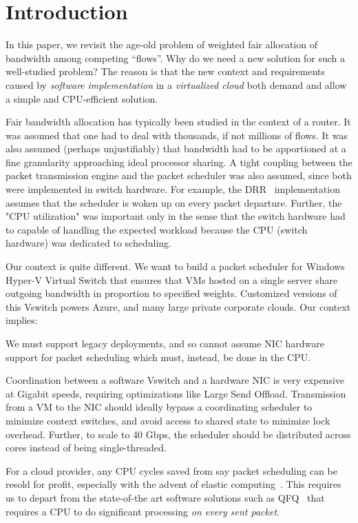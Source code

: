 \section {Introduction}

In this paper, we revisit the age-old problem of weighted fair allocation of
bandwidth among competing ``flows''. Why do we need a new solution for such a
well-studied problem? The reason is that the new context and requirements caused
by {\em software implementation} in a {\em virtualized cloud} both demand and
allow a simple and CPU-efficient solution. 

Fair bandwidth allocation has typically been studied in the context of a router.
It was assumed that one had to deal with thousands, if not millions of flows. It
was also assumed (perhaps unjustifiably) that bandwidth had to be apportioned at
a fine granularity approaching ideal processor sharing. A tight coupling between
the packet transmission engine and the packet scheduler was also assumed, since
both were implemented in switch hardware.  For example, the DRR~\cite{drr}
implementation assumes that the scheduler is woken up on every packet departure.
Further, the "CPU utilization" was important only in the sense that the switch
hardware had to capable of handling the expected workload because the CPU
(switch hardware) was dedicated to scheduling.

Our context is quite different. We want to build a packet scheduler for Windows
Hyper-V Virtual Switch that ensures that VMs hosted on a single server share
outgoing bandwidth in proportion to specified weights. Customized versions of
this Vswitch powers Azure, and many large private corporate clouds. Our context
implies:

 We must support legacy deployments, and so cannot assume NIC hardware support for
packet scheduling which must, instead, be done in the CPU.

 Coordination between a
software Vswitch and a hardware NIC is very expensive at Gigabit speeds, requiring optimizations
like Large Send Offload.  Transmission from a VM to the NIC
should ideally bypass a coordinating scheduler to
minimize context switches, and avoid access to shared state to minimize lock
overhead.  Further, to scale to 40 Gbps, the scheduler should be distributed
across cores instead of being single-threaded. 

 For a cloud provider, any CPU cycles saved from
say packet scheduling can be resold for profit, especially with the advent of
elastic computing~\cite{aws}.  This requires us to depart from the state-of-the
art software solutions such as QFQ~\cite{qfq} that requires a CPU to do
significant processing {\em on every sent packet}.

